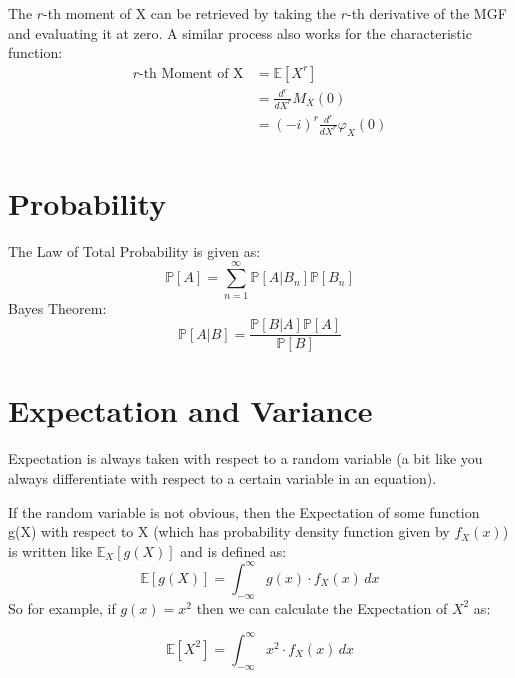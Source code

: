 The $r$-th moment of X can be retrieved by taking the $r$-th derivative of the
MGF and evaluating it at zero. A similar process also works for the
characteristic function:
\begin{equation*}
    \begin{aligned}
        \text{$r$-th Moment of X} &= \mathbb{E}[X^r] \\
                                  &= \frac{d^r}{dX^r} M_X(0) \\
                                  &= (-i)^r \frac{d^r}{dX^r} \varphi_X(0) \\
    \end{aligned}
\end{equation*}



\section{Probability}
The Law of Total Probability is given as:
\begin{equation*}
    \mathbb{P}[A] = \sum_{n=1}^{\infty} \mathbb{P}[A|B_n] \mathbb{P}[B_n] 
\end{equation*}
Bayes Theorem:
\begin{equation*}
    \mathbb{P}[A | B] = \frac{ \mathbb{P}[B|A] \mathbb{P}[A]  }{ \mathbb{P}[B] }
\end{equation*}




\section{Expectation and Variance}
Expectation is always taken with respect to a random variable (a bit like you
always differentiate with respect to a certain variable in an equation). 

If the random variable is not obvious, then the Expectation of some function
g(X) with respect to X (which has probability density function given by
$f_X(x)$) is written like $\mathbb{E}_X[g(X)]$ and is defined as:
\begin{equation*}
    \mathbb{E}[g(X)] = \int_{-\infty}^{\infty} g(x) \cdot f_X(x) \,dx 
\end{equation*}
So for example, if $g(x) = x^2$ then we can calculate the Expectation of $X^2$
as:

\begin{equation*}
    \mathbb{E}[X^2] = \int_{-\infty}^{\infty} x^2 \cdot f_X(x) \,dx 
\end{equation*}

